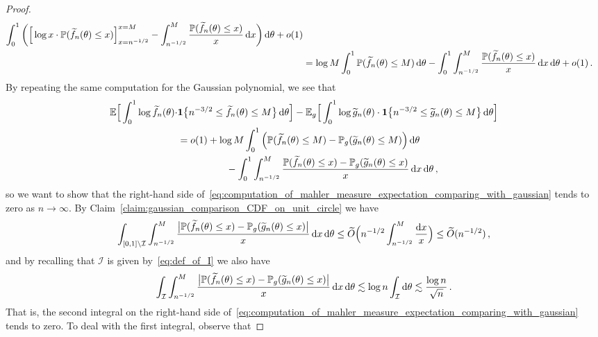 \documentclass[11pt]{amsart}
\theoremstyle{remark}
\theoremstyle{definition}
\newcommand{\bP}{\mathbb P}
\newcommand{\bE}{\mathbb E}
\newcommand{\one}{\boldsymbol{1}}
\begin{document}
\begin{proof}
\begin{align*}
            \int_{0}^1 \bigg(\Big[\log x \cdot\bP(\widetilde f_n(\theta) \le x) \Big]_{x=n^{-1/2}}^{x=M} - \int_{n^{-1/2}}^{M} \frac{\bP(\widetilde f_n(\theta) \le x)}{x} \, {\rm d} x\bigg) \,  {\rm d}\theta  + o(1) \\ &= \log M\int_{0}^{1} \bP(\widetilde f_n(\theta) \le M) \,  {\rm d}\theta - \int_{0}^{1} \int_{n^{-1/2}}^{M} \frac{\bP(\widetilde f_n(\theta) \le x)}{x} \, {\rm d} x \,  {\rm d}\theta + o(1) \, .
        \end{align*}
        By repeating the same computation for the Gaussian polynomial, we see that 
        \begin{align}
            \label{eq:computation_of_mahler_measure_expectation_comparing_with_gaussian}
            \nonumber
           \bE\Big[ \int_{0}^1 \log \widetilde{f}_n(\theta) \cdot &  \one\big\{  n^{-3/2} \le \widetilde f_n(\theta) \le M \big\} \, {\rm d}\theta \Big] - \bE_g\Big[ \int_{0}^1 \log \widetilde{g}_n(\theta) \cdot   \one\big\{  n^{-3/2} \le \widetilde g_n(\theta) \le M \big\} \, {\rm d}\theta \Big] \\ &= o(1) + \log M \int_0^1 \Big(\bP(\widetilde f_n(\theta) \le M) - \bP_g(\widetilde g_n(\theta) \le M)\Big) \, {\rm d}\theta \\ \nonumber & \qquad \quad \qquad - \int_0^1 \int_{n^{-1/2}}^M \frac{\bP(\widetilde f_n(\theta) \le x) - \bP_g(\widetilde g_n(\theta) \le x)}{x} \, {\rm d} x \,  {\rm d}\theta  \, ,
        \end{align}
        so we want to show that the right-hand side of~\eqref{eq:computation_of_mahler_measure_expectation_comparing_with_gaussian} tends to zero as $n\to\infty$. By Claim~\ref{claim:gaussian_comparison_CDF_on_unit_circle} we have
        \[
         \int_{[0,1]\setminus \mathcal{I}}\int_{n^{-1/2}}^M \frac{\big|\bP(\widetilde f_n(\theta) \le x) - \bP_g(\widetilde g_n(\theta) \le x)\big|}{x} \, {\rm d} x  \, {\rm d}\theta \le \widetilde{O} \Big(n^{-1/2} \int_{n^{-1/2}}^M \frac{{\rm d} x}{x}\Big) \le \widetilde{O}(n^{-1/2}) \, ,
        \]
        and by recalling that $\mathcal{I}$ is given by~\eqref{eq:def_of_I} we also have
        \[
        \int_{\mathcal{I}}\int_{n^{-1/2}}^M \frac{\big|\bP(\widetilde f_n(\theta) \le x) - \bP_g(\widetilde g_n(\theta) \le x)\big|}{x} \, {\rm d} x \, {\rm d}\theta  \lesssim \log n \int_{\mathcal{I}} {\rm d}\theta \lesssim \frac{\log n}{\sqrt{n}} \, .
        \]
        That is, the second integral on the right-hand side of~\eqref{eq:computation_of_mahler_measure_expectation_comparing_with_gaussian} tends to zero. To deal with the first integral, observe that

\end{proof}
\end{document}
